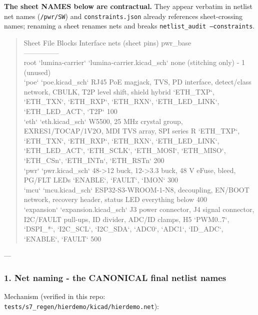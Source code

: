 \documentclass[11pt,a4paper]{article}
\begin{document}
\textbf{The sheet NAMES below are contractual.} They appear verbatim in netlist net names (\texttt{/pwr/SW}) and \texttt{constraints.json} already references sheet-crossing names; renaming a sheet renames nets and breaks \texttt{netlist\_audit --constraints}.

\begin{quote}\small\ttfamily\raggedright
\textbar{} Sheet \textbar{} File \textbar{} Blocks \textbar{} Interface nets (sheet pins) \textbar{} pwr\_base \textbar{}\\
\textbar{}---\textbar{}---\textbar{}---\textbar{}---\textbar{}---\textbar{}\\
\textbar{} root `lumina-carrier` \textbar{} `lumina-carrier.kicad\_sch` \textbar{} none (stitching only) \textbar{} - \textbar{} 1 (unused) \textbar{}\\
\textbar{} `poe` \textbar{} `poe.kicad\_sch` \textbar{} RJ45 PoE magjack, TVS, PD interface, detect/class network, CBULK, T2P level shift, shield hybrid \textbar{} `ETH\_TXP`, `ETH\_TXN`, `ETH\_RXP`, `ETH\_RXN`, `ETH\_LED\_LINK`, `ETH\_LED\_ACT`, `T2P` \textbar{} 100 \textbar{}\\
\textbar{} `eth` \textbar{} `eth.kicad\_sch` \textbar{} W5500, 25 MHz crystal group, EXRES1/TOCAP/1V2O, MDI TVS array, SPI series R \textbar{} `ETH\_TXP`, `ETH\_TXN`, `ETH\_RXP`, `ETH\_RXN`, `ETH\_LED\_LINK`, `ETH\_LED\_ACT`, `ETH\_SCLK`, `ETH\_MOSI`, `ETH\_MISO`, `ETH\_CSn`, `ETH\_INTn`, `ETH\_RSTn` \textbar{} 200 \textbar{}\\
\textbar{} `pwr` \textbar{} `pwr.kicad\_sch` \textbar{} 48-\textgreater{}12 buck, 12-\textgreater{}3.3 buck, 48 V eFuse, bleed, PG/FLT LEDs \textbar{} `ENABLE`, `FAULT`, `IMON` \textbar{} 300 \textbar{}\\
\textbar{} `mcu` \textbar{} `mcu.kicad\_sch` \textbar{} ESP32-S3-WROOM-1-N8, decoupling, EN/BOOT network, recovery header, status LED \textbar{} everything below \textbar{} 400 \textbar{}\\
\textbar{} `expansion` \textbar{} `expansion.kicad\_sch` \textbar{} J3 power connector, J4 signal connector, I2C/FAULT pull-ups, ID divider, ADC/ID clamps, H5 \textbar{} `PWM0..7`, `DSPI\_{*}`, `I2C\_SCL`, `I2C\_SDA`, `ADC0`, `ADC1`, `ID\_ADC`, `ENABLE`, `FAULT` \textbar{} 500 \textbar{}
\end{quote}
---

\subsubsection*{1. Net naming - the CANONICAL final netlist names}
Mechanism (verified in this repo: \texttt{tests/s7\_regen/hierdemo/kicad/hierdemo.net}):
\end{document}
